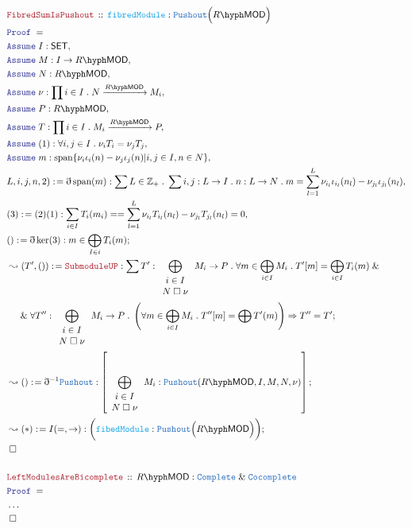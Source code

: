 \documentclass[12pt]{scrartcl}
\newcommand{\TYPE}[1]{\textcolor{NavyBlue}{\mathtt{#1}}}
\newcommand{\FUNC}[1]{\textcolor{Cerulean}{\mathtt{#1}}}
\newcommand{\LOGIC}[1]{\textcolor{Blue}{\mathtt{#1}}}
\newcommand{\THM}[1]{\textcolor{Maroon}{\mathtt{#1}}}
\renewcommand{\.}{\; . \;}
\newcommand{\de}{: \kern 0.1pc =}
\newcommand{\Theorem}[2]{& \THM{#1} \, :: \, #2 \\ & \Proof = \\ }
\newcommand{\NewLine}{\\ & \kern 1pc}
\newcommand{\Page}[1]{ \begin{align*} #1 \end{align*}   }
\newcommand{ \bd }{ \ByDef }
\newcommand{\NoProof}{ & \ldots \\ \EndProof}
\renewcommand{\And}{\; \& \;}
\newcommand{\Int}{\mathbb{Z} }
\newcommand{\Say}[3]{& #1 \de #2 : #3, \\}
\newcommand{\Conclude}[3]{& #1 \de #2 : #3; \\}
\newcommand{\DeriveConclude}[3]{& \leadsto #1 \de #2 : #3 ; \\}
\newcommand{\Assume}[2]{& \LOGIC{Assume} \; #1 : #2, \\}
\newcommand{\QED}{\; \square}
\newcommand{\EndProof}{& \QED \\}
\newcommand{\ByDef}{\eth}
\newcommand{\Proof}{\LOGIC{Proof} \; }
\newcommand{\Arrow}[1]{\xrightarrow{#1}}
\newcommand{\SET}{\mathsf{SET}}
\DeclareMathOperator{\Span}{span}
\newcommand{\LMOD}[1]{#1\hyph\mathsf{MOD}}
\begin{document}
\Page{
	\Theorem{FibredSumIsPushout}{ \FUNC{fibredModule} : \TYPE{Pushout}\Big(\LMOD{R}\Big)}
	\Assume{I}{\SET}
	\Assume{M}{I \to \LMOD{R}}
	\Assume{N}{\LMOD{R}}
	\Assume{\nu}{\prod i \in I \. N \Arrow{\LMOD{R}} M_i} 
	\Assume{P}{\LMOD{R}}
	\Assume{T}{\prod i \in I \. M_i \Arrow{\LMOD{R}} P}
	\Assume{(1)}{\forall i,j \in I \. \nu_iT_i = \nu_jT_j }
	\Assume{ m }{ \Span\{ \nu_i\iota_i(n) - \nu_j\iota_j(n) | i,j \in I, n \in N  \}  }
	\Say{L,i,j,n,2)}{\bd \Span (m)}{\sum L \in \Int_+ \. \sum i,j : L \to I \. n : L \to N \. m = \sum^{L}_{l=1} \nu_{i_l}\iota_{i_l}(n_l) - \nu_{j_l}\iota_{j_l}(n_l)}
	\Say{(3)}{(2)(1)}{  \sum_{i \in I} T_i(m_i) = 
		= \sum^L_{l = 1} \nu_{i_l}T_{i_l}(n_l) - \nu_{j_l}T_{j_l}(n_l) = 0  }
	\Conclude{()}{\bd \ker(3)}{m  \in \bigoplus_{I \in i} T_i(m)}
	\DeriveConclude{(T', ())}{ \THM{SubmoduleUP} }{\sum T' : \bigoplus_{ \begin{array}{c}i \in I \\ N\;\square\;\nu \end{array}} M_i  \to P  \. 
		\forall m \in \bigoplus_{i \in I} M_i \. T'[m] = \bigoplus_{i \in I} T_i(m) \And \NewLine \And
		\forall T'' :  \bigoplus_{ \begin{array}{c}i \in I \\ N\;\square\;\nu \end{array}} M_i  \to P \. 
		\left( \forall m \in \bigoplus_{i \in I} M_i \. T''[m] = \bigoplus T'(m)\right) \Rightarrow T'' = T'  } 
	\DeriveConclude{()}{\bd^{-1}\TYPE{Pushout}}{\left[\bigoplus_{ \begin{array}{c}i \in I \\ N\;\square\;\nu \end{array}} M_i :
			\TYPE{Pushout}(\LMOD{R},I,M,N,\nu)\right]}
	\DeriveConclude{(*)}{I(=,\to)}{\bigg(\FUNC{fibedModule} : \TYPE{Pushout}\Big(\LMOD{R}\Big)\bigg)}
	\EndProof
	\\
	\Theorem{LeftModulesAreBicomplete}{\LMOD{R} : \TYPE{Complete} \And \TYPE{Cocomplete}}
	\NoProof
}
\newpage
\end{document}
